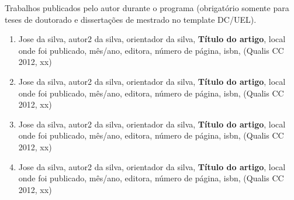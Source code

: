 \documentclass[
	12pt,				%
	openright,			%
	twoside,			%
	a4paper,			%
	tcc,			%
]{cct-uenp}
\begin{document}
\noindent
Trabalhos publicados pelo autor durante o programa (obrigatório somente
para teses de doutorado e dissertações de mestrado no template DC/UEL).

\vspace{12pt}

\begin{enumerate}

\item Jose da silva, autor2 da silva, orientador da silva, \textbf{Título do artigo}, local onde foi
publicado, mês/ano, editora, número de página, isbn, (Qualis CC 2012, xx)

\item Jose da silva, autor2 da silva, orientador da silva, \textbf{Título do artigo}, local onde foi
publicado, mês/ano, editora, número de página, isbn, (Qualis CC 2012, xx)

\item Jose da silva, autor2 da silva, orientador da silva, \textbf{Título do artigo}, local onde foi
publicado, mês/ano, editora, número de página, isbn, (Qualis CC 2012, xx)

\item Jose da silva, autor2 da silva, orientador da silva, \textbf{Título do artigo}, local onde foi
publicado, mês/ano, editora, número de página, isbn, (Qualis CC 2012, xx)

\end{enumerate}



\printindex
\end{document}
